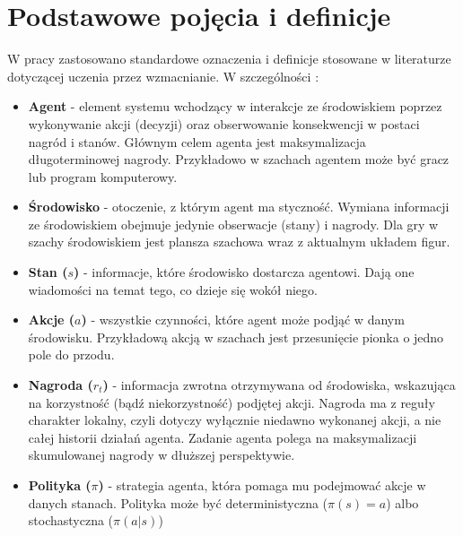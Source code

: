 \documentclass[a4paper, 12pt]{article}
\numberwithin{equation}{section}
\begin{document}
    \section{Podstawowe pojęcia i definicje}
    W pracy zastosowano standardowe oznaczenia i definicje stosowane w literaturze dotyczącej uczenia przez wzmacnianie. 
    W szczególności \cite{lapan2020deep}:
    \begin{itemize}
        \item \textbf{Agent} - element systemu wchodzący w interakcje ze środowiskiem poprzez wykonywanie akcji (decyzji) oraz obserwowanie konsekwencji w postaci nagród i stanów.
        Głównym celem agenta jest maksymalizacja długoterminowej nagrody. 
        Przykładowo w szachach agentem może być gracz lub program komputerowy.
        \item \textbf{Środowisko} - otoczenie, z którym agent ma styczność. 
        Wymiana informacji ze środowiskiem obejmuje jedynie obserwacje (stany) i nagrody.
        Dla gry w szachy środowiskiem jest plansza szachowa wraz z aktualnym układem figur.
        \item \textbf{Stan (\( s \))} - informacje, które środowisko dostarcza agentowi. Dają one wiadomości na temat tego, co dzieje się wokół niego.
        \item \textbf{Akcje (\( a \))} - wszystkie czynności, które agent może podjąć w danym środowisku. 
        Przykładową akcją w szachach jest przesunięcie pionka o jedno pole do przodu.
        \item \textbf{Nagroda (\( r_t \))} - informacja zwrotna otrzymywana od środowiska, wskazująca na korzystność (bądź niekorzystność) podjętej akcji. 
        Nagroda ma z reguły charakter lokalny, czyli dotyczy wyłącznie niedawno wykonanej akcji, a nie całej historii działań agenta. 
        Zadanie agenta polega na maksymalizacji skumulowanej nagrody w dłuższej perspektywie.
        \item \textbf{Polityka (\( \pi \))} - strategia agenta, która pomaga mu podejmować akcje w danych stanach. Polityka może być deterministyczna
        (\( \pi(s) = a \)) albo stochastyczna (\( \pi(a|s) \))
    \end{itemize}
\end{document}
